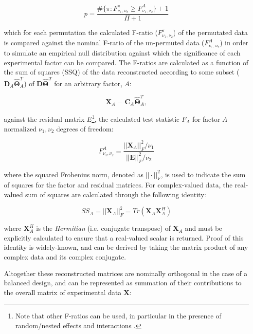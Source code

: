 \documentclass[preprint,12pt]{elsarticle}
\begin{document}
\begin{equation}
p = \frac{\#\{\pi:F^\pi_{\nu_1,\nu_2} \geq F^{A}_{\nu_1,\nu_2}\} + 1}{\Pi+1}
\end{equation}

\noindent which for each permutation the calculated F-ratio ($F^\pi_{\nu_1,\nu_2}$) of the permutated data is compared against the nominal F-ratio of the un-permuted data ($F^{A}_{\nu_1,\nu_2}$) in order to simulate an empirical null distribution against which the significance of each experimental factor can be compared. The F-ratios are calculated as a function of the sum of squares (SSQ) of the data reconstructed according to some subset ($\mathbf{D}_A\mathbf{\hat{\Theta}}_A^T$) of $\mathbf{D}\mathbf{\hat{\Theta}}^T$ for an arbitrary factor, $A$:

\begin{equation}\label{eq:rec}
    \mathbf{X}_A = \mathbf{C}_A\mathbf{\hat{\Theta}}^T_A,
\end{equation}

\noindent against the residual matrix $E$\footnote{Note that other F-ratios can be used, in particular in the presence of random/nested effects and interactions \cite{anderson2014permutational}.}, the calculated test statistic $F_A$ for factor $A$ normalized $\nu_1, \nu_2$ degrees of freedom:

 \begin{equation}\label{eq:sig_test}
    F^A_{\nu_1,\nu_2} = \frac{||\mathbf{X}_A||_F^2/\nu_1}{||\mathbf{E}||^2_F/\nu_2}
\end{equation}

\noindent where the squared Frobenius norm, denoted as $||\cdot||^2_F$, is used to indicate the sum of squares for the factor and residual matrices. For complex-valued data, the real-valued sum of squares are calculated through the following identity:

\begin{equation}\label{eq:ssq}
    SS_A = ||\mathbf{X}_A||^2_F = Tr(\mathbf{X}_A\mathbf{X}_A^H)
\end{equation}

\noindent where $\mathbf{X}^H_A$ is the \textit{Hermitian} (i.e. conjugate transpose) of $\mathbf{X}_A$ and must be explicitly calculated to ensure that a real-valued scalar is returned. Proof of this identity is widely-known, and can be derived by taking the matrix product of any complex data and its complex conjugate.

Altogether these reconstructed matrices are nominally orthogonal in the case of a balanced design, and can be represented as summation of their contributions to the overall matrix of experimental data $\mathbf{X}$:
\end{document}
